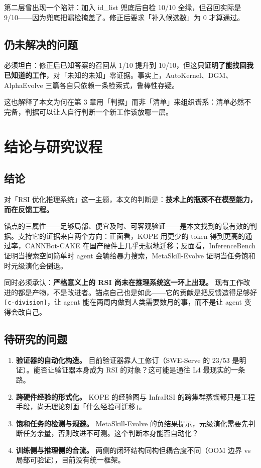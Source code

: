 第二层曾出现一个陷阱：加入 id\_list 兜底后自检 10/10 全绿，但召回实际是 9/10——因为兜底把漏检掩盖了。修正后要求「补入候选数」为 0 才算通过。


\subsection{仍未解决的问题}

必须坦白：修正后已知答案的召回从 1/10 提升到 10/10，但这\textbf{只证明了能找回我已知道的工作}，对「未知的未知」零证据。事实上，AutoKernel、DGM、AlphaEvolve 三篇各自只依赖一条检索式，鲁棒性存疑。


这也解释了本文为何在第 3 章用「判据」而非「清单」来组织谱系：清单必然不完备，判据可以让人自行判断一个新工作该放哪一层。



\section{结论与研究议程}

\subsection{结论}

对「RSI 优化推理系统」这一主题，本文的判断是：\textbf{技术上的瓶颈不在模型能力，而在反馈工程。}


锚点的三属性——足够局部、便宜及时、可客观验证——是本文找到的最有效的判据。支持它的证据来自两个方向：正面看，KOPE 用更少的 token 得到更高的通过率，CANNBot-CAKE 在国产硬件上几乎无损地迁移；反面看，InferenceBench 证明当搜索空间简单时 agent 会输给暴力搜索，MetaSkill-Evolve 证明当任务饱和时元级演化会倒退。


同时必须承认：\textbf{严格意义上的 RSI 尚未在推理系统这一环上出现。} 现有工作改进的都是产物，不是改进者。锚点自己也是如此——它的贡献是把反馈造得足够好{\scriptsize\texttt{[c-\hspace{0pt}division]}}，让 agent 能在两周内做到人类需要数月的事，而不是让 agent 变得会改自己。


\subsection{待研究的问题}

\begin{enumerate}
  \item \textbf{验证器的自动化构造。} 目前验证器靠人工修订（SWE-Serve 的 23/53 是明证）。能否让验证器本身成为 RSI 的对象？这可能是通往 L4 最现实的一条路。
  \item \textbf{跨硬件经验的形式化。} KOPE 的经验图与 InfraRSI 的跨集群蒸馏都只是工程手段，尚无理论刻画「什么经验可迁移」。
  \item \textbf{饱和任务的检测与规避。} MetaSkill-Evolve 的负结果提示，元级演化需要先判断任务余量，否则改进不可测。这个判断本身能否自动化？
  \item \textbf{训练侧与推理侧的合流。} 两侧的闭环结构同构但耦合度不同（OOM 边界 vs 局部可验证），目前没有统一框架。
\end{enumerate}

